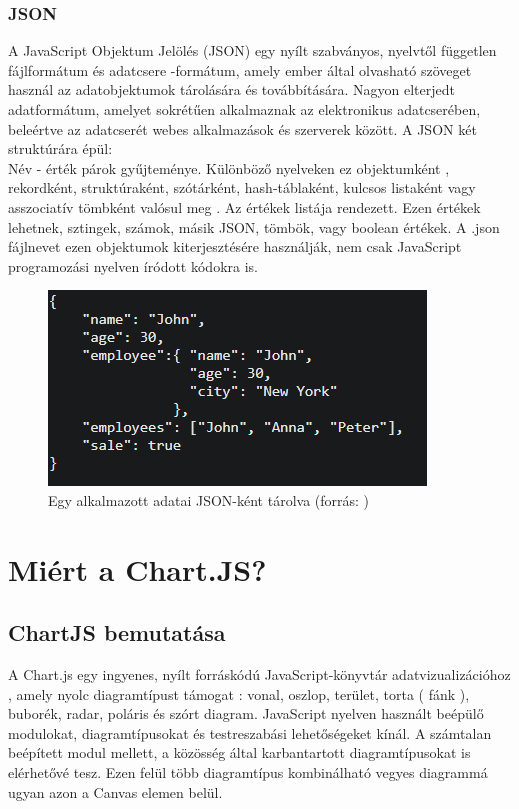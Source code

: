 \subsubsection{JSON}

A JavaScript Objektum Jelölés (JSON) egy nyílt szabványos,  nyelvtől független fájlformátum és adatcsere -formátum, amely ember által olvasható szöveget használ az adatobjektumok tárolására és továbbítására. Nagyon elterjedt adatformátum, amelyet sokrétűen alkalmaznak az elektronikus adatcserében, beleértve az adatcserét webes alkalmazások és szerverek között. A JSON két struktúrára épül: \\

Név - érték párok gyűjteménye. Különböző nyelveken ez objektumként , rekordként, struktúraként, szótárként, hash-táblaként, kulcsos listaként vagy asszociatív tömbként valósul meg .
Az értékek listája rendezett. Ezen értékek lehetnek, sztingek, számok,  másik JSON, tömbök, vagy boolean értékek.
A .json fájlnevet ezen objektumok kiterjesztésére használják, nem csak JavaScript programozási nyelven íródott kódokra is. \\

\begin{figure}[h]
\centering
\includegraphics[scale=0.9]{images/jsonExample.png}
\caption{Egy alkalmazott adatai JSON-ként tárolva (forrás: \cite{jsonExample})}
\end{figure}


\section{Miért a Chart.JS? \cite{ChartJS}}

\subsection{ChartJS bemutatása}

A Chart.js egy ingyenes, nyílt forráskódú JavaScript-könyvtár adatvizualizációhoz , amely nyolc diagramtípust támogat : vonal, oszlop, terület, torta ( fánk ), buborék, radar, poláris és szórt diagram. JavaScript nyelven használt beépülő modulokat, diagramtípusokat és testreszabási lehetőségeket kínál. A számtalan beépített modul mellett, a közösség által karbantartott diagramtípusokat is elérhetővé tesz. Ezen felül több diagramtípus kombinálható vegyes diagrammá ugyan azon a Canvas elemen belül.

